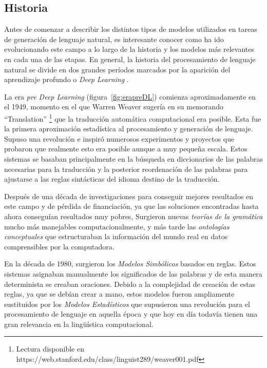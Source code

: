 \subsection{Historia}
Antes de comenzar a describir los distintos tipos de modelos utilizados en tareas de generación de lenguaje natural, es interesante conocer como ha ido evolucionando este campo a lo largo de la historia y los modelos más relevantes en cada una de las etapas. En general, la historia del procesamiento de lenguaje natural se divide en dos grandes períodos marcados por la aparición del aprendizaje profundo o \textit{Deep Learning} \citep{louis-2021}. 

La era \textit{pre Deep Learning} (figura~\ref{fig:erapreDL}) comienza aproximadamente en el 1949, momento en el que   Warren Weaver sugería en su memorando ``Translation'' \footnote{ Lectura disponible en https://web.stanford.edu/class/linguist289/weaver001.pdf} que la traducción automática computacional era posible. Esta fue la primera aproximación estadística al procesamiento y generación de lenguaje. Supuso una revolución e inspiró numerosos experimentos y proyectos que probaron que realmente esto era posible aunque a muy pequeña escala. Estos sistemas se basaban principalmente en la búsqueda en diccionarios de las palabras necesarias para la traducción y la posterior reordenación de las palabras para ajustarse a las reglas sintácticas del idioma destino de la traducción.

Después de una década de investigaciones para conseguir mejores resultados en este campo y de pérdida de financiación, ya que las soluciones encontradas hasta ahora conseguían resultados muy pobres, Surgieron nuevas \textit{teorías de la gramática} mucho más manejables computacionalmente, y más tarde las \textit{ontologías conceptuales} que estructuraban la información del mundo real en datos comprensibles por la computadora.

En la década de 1980, surgieron los \textit{Modelos Simbólicos} basados en reglas. Estos sistemas asignaban manualmente los significados de las palabras y de esta manera determinista se creaban oraciones. Debido a la complejidad de creación de estas reglas, ya que se debían crear a mano, estos modelos fueron ampliamente sustituidos por los\textit{ Modelos Estadísticos} que supusieron una revolución para el procesamiento de lenguaje en aquella época y que hoy en día todavía tienen una gran relevancia en la lingüística computacional. 


